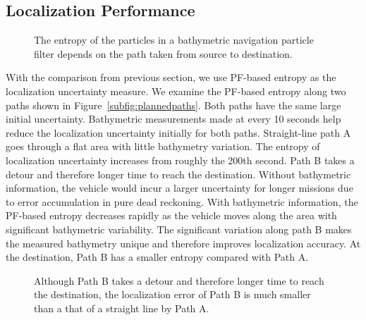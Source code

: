 \subsection{Localization Performance}


\begin{figure}[htbp]
\begin{center}
\caption{The entropy of the particles in a bathymetric navigation particle filter depends on the path taken from source to destination.}
\label{fig:allpaths}
\end{center}
\end{figure}

With the comparison from previous section, we use PF-based entropy as the localization uncertainty measure. We examine the PF-based entropy along two paths shown in Figure~\ref{subfig:plannedpaths}. Both paths have the same large initial uncertainty. Bathymetric measurements made at every 10 seconds help reduce the localization uncertainty initially for both paths. Straight-line path A goes through a flat area with little bathymetry variation. The entropy of localization uncertainty increases from roughly the 200th second. Path B takes a detour and therefore longer time to reach the destination. Without bathymetric information, the vehicle would incur a larger uncertainty for longer missions due to error accumulation in pure dead reckoning. With bathymetric information, the PF-based entropy decreases rapidly as the vehicle moves along the area with significant bathymetric variability. The significant variation along path B makes the measured bathymetry unique and therefore improves localization accuracy. At the destination, Path B has a smaller entropy compared with Path A.

\begin{figure}[thbp]
\begin{center}
\caption{Although Path B takes a detour and therefore longer time to reach the destination, the localization error of Path B is much smaller than a that of a straight line by Path A.}
\label{fig:SimulationPathAB}
\end{center}
\end{figure}

